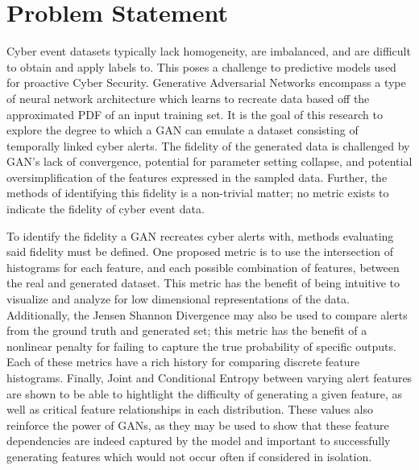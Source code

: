 \documentclass[12pt,american]{report}
\begin{document}
\section{Problem Statement}

Cyber event datasets typically lack homogeneity, are imbalanced, and are difficult to obtain and apply labels to. This poses a challenge to predictive models used for proactive Cyber Security. Generative Adversarial Networks encompass a type of neural network architecture which learns to recreate data based off the approximated PDF of an input training set. It is the goal of this research to explore the degree to which a GAN can emulate a dataset consisting of temporally linked cyber alerts. The fidelity of the generated data is challenged by GAN’s lack of convergence, potential for parameter setting collapse, and potential oversimplification of the features expressed in the sampled data. Further, the methods of identifying this fidelity is a non-trivial matter; no metric exists to indicate the fidelity of cyber event data. 

To identify the fidelity a GAN recreates cyber alerts with, methods evaluating said fidelity must be defined. One proposed metric is to use the intersection of histograms for each feature, and each possible combination of features, between the real and generated dataset. This metric has the benefit of being intuitive to visualize and analyze for low dimensional representations of the data. Additionally, the Jensen Shannon Divergence may also be used to compare alerts from the ground truth and generated set; this metric has the benefit of a nonlinear penalty for failing to capture the true probability of specific outputs. Each of these metrics have a rich history for comparing discrete feature histograms. Finally, Joint and Conditional Entropy between varying alert features are shown to be able to hightlight the difficulty of generating a given feature, as well as critical feature relationships in each distribution. These values also reinforce the power of GANs, as they may be used to show that these feature dependencies are indeed captured by the model and important to successfully generating features which would not occur often if considered in isolation. 
\end{document}

